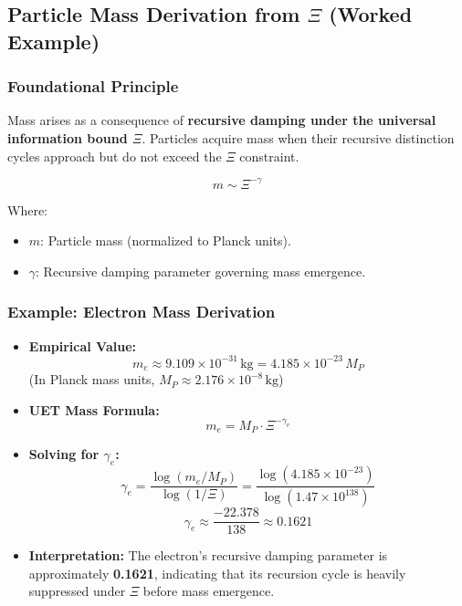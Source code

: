 \documentclass[12pt,a4paper]{article}
\begin{document}
\subsection{Particle Mass Derivation from \(\Xi\) (Worked Example)}

\subsubsection*{Foundational Principle}

Mass arises as a consequence of \textbf{recursive damping under the universal information bound \(\Xi\)}. Particles acquire mass when their recursive distinction cycles approach but do not exceed the \(\Xi\) constraint.

\[
m \sim \Xi^{-\gamma}
\]

Where:
\begin{itemize}
    \item \(m\): Particle mass (normalized to Planck units).
    \item \(\gamma\): Recursive damping parameter governing mass emergence.
\end{itemize}

\subsubsection*{Example: Electron Mass Derivation}

\begin{itemize}
    \item \textbf{Empirical Value:} 
    \[
    m_e \approx 9.109 \times 10^{-31} \, \text{kg} = 4.185 \times 10^{-23} \, M_P
    \]
    (In Planck mass units, \(M_P \approx 2.176 \times 10^{-8} \, \text{kg}\))

    \item \textbf{UET Mass Formula:} 
    \[
    m_e = M_P \cdot \Xi^{-\gamma_e}
    \]

    \item \textbf{Solving for \(\gamma_e\):}
    \[
    \gamma_e = \frac{\log(m_e / M_P)}{\log(1 / \Xi)} = \frac{\log(4.185 \times 10^{-23})}{\log(1.47 \times 10^{138})}
    \]
    \[
    \gamma_e \approx \frac{-22.378}{138} \approx 0.1621
    \]

    \item \textbf{Interpretation:}  
    The electron’s recursive damping parameter is approximately \textbf{0.1621}, indicating that its recursion cycle is heavily suppressed under \(\Xi\) before mass emergence.
\end{itemize}
\end{document}
